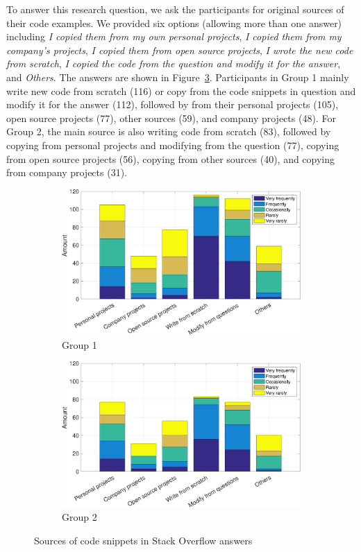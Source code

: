 \documentclass{svjour3}                     %
\begin{document}
To answer this research question, we ask the participants for original
sources of their code examples. We provided six options (allowing more than one answer)
including \textit{I copied them from my own personal projects}, \textit{I copied
	them from my company's projects}, \textit{I copied them from open source
	projects}, \textit{I wrote the new code from scratch}, \textit{I copied the code
	from the question and modify it for the answer}, and \textit{Others}. The
answers are shown in Figure~\ref{fig:survey_snippet_source}. Participants
in Group 1 mainly write new code from scratch (116) or copy from the code snippets in question
and modify it for the answer (112), followed by from their personal
projects (105), open source projects (77), other sources (59), and company projects (48). 
For Group 2, the main source is also writing code from scratch (83), followed by copying
from personal projects and modifying from the question (77), copying from open source projects (56),
copying from other sources (40), and copying from company projects (31).

\begin{figure}
	\begin{subfigure}{.5\textwidth}
		\centering
		\includegraphics[width=.9\linewidth]{survey_snippet_source_1}
		\caption{Group 1}
		\label{fig:survey_snippet_source_1}
	\end{subfigure}%
	\begin{subfigure}{.5\textwidth}
		\centering
		\includegraphics[width=.9\linewidth]{survey_snippet_source_2}
		\caption{Group 2}
		\label{fig:survey_snippet_source_2}
	\end{subfigure}
	\caption{Sources of code snippets in Stack Overflow answers}
	\label{fig:survey_snippet_source}
\end{figure}
\end{document}
